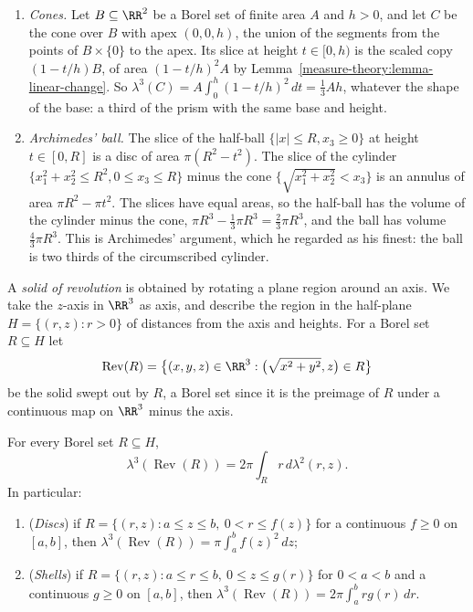 \begin{example}\label{measure-theory:example-cavalieri}
\begin{enumerate}
\item \emph{Cones.} Let $B \subseteq \RR^2$ be a Borel set of finite area $A$ and $h > 0$, and let $C$ be the cone over $B$ with apex $(0, 0, h)$, the union of the segments from the points of $B \times \{0\}$ to the apex.
Its slice at height $t \in [0, h)$ is the scaled copy $(1 - t/h)B$, of area $(1 - t/h)^2A$ by Lemma~\ref{measure-theory:lemma-linear-change}. So $\lambda^3(C) = A\int_0^h(1 - t/h)^2\,dt = \frac13Ah$, whatever the shape of the
base: a third of the prism with the same base and height.
\item \emph{Archimedes' ball.} The slice of the half-ball $\{|x| \leq R, x_3 \geq 0\}$ at height $t \in [0, R]$ is a disc of area $\pi(R^2 - t^2)$. The slice of the cylinder $\{x_1^2 + x_2^2 \leq R^2, 0 \leq x_3 \leq R\}$ minus
the cone $\{\sqrt{x_1^2 + x_2^2} < x_3\}$ is an annulus of area $\pi R^2 - \pi t^2$. The slices have equal areas, so the half-ball has the volume of the cylinder minus the cone, $\pi R^3 - \frac13\pi R^3 = \frac23\pi R^3$, and
the ball has volume $\frac43\pi R^3$. This is Archimedes' argument, which he regarded as his finest: the ball is two thirds of the circumscribed cylinder.
\end{enumerate}
\end{example}

A \emph{solid of revolution} is obtained by rotating a plane region around an axis. We take the $z$-axis in $\RR^3$ as axis, and describe the region in the half-plane $H = \{(r, z) : r > 0\}$ of distances
from the axis and heights. For a Borel set $R \subseteq H$ let
\[
\operatorname{Rev}(R) = \bigl\{(x, y, z) \in \RR^3 : \bigl(\sqrt{x^2 + y^2}, z\bigr) \in R\bigr\}
\]
be the solid swept out by $R$, a Borel set since it is the preimage of $R$ under a continuous map on $\RR^3$ minus the axis.

\begin{proposition}\label{measure-theory:proposition-revolution-volume}
For every Borel set $R \subseteq H$,
\[
\lambda^3(\operatorname{Rev}(R)) = 2\pi\int_Rr\,d\lambda^2(r, z) .
\]
In particular:
\begin{enumerate}
\item (\emph{Discs}) if $R = \{(r, z) : a \leq z \leq b,\ 0 < r \leq f(z)\}$ for a continuous $f \geq 0$ on $[a, b]$, then $\lambda^3(\operatorname{Rev}(R)) = \pi\int_a^bf(z)^2\,dz$;
\item (\emph{Shells}) if $R = \{(r, z) : a \leq r \leq b,\ 0 \leq z \leq g(r)\}$ for $0 < a < b$ and a continuous $g \geq 0$ on $[a, b]$, then $\lambda^3(\operatorname{Rev}(R)) = 2\pi\int_a^brg(r)\,dr$.
\end{enumerate}
\end{proposition}

